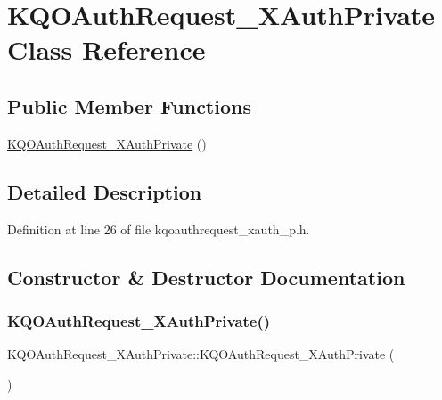 \hypertarget{class_k_q_o_auth_request___x_auth_private}{}\section{K\+Q\+O\+Auth\+Request\+\_\+\+X\+Auth\+Private Class Reference}
\label{class_k_q_o_auth_request___x_auth_private}
\subsection*{Public Member Functions}
\begin{DoxyCompactItemize}
\item 
\hyperlink{class_k_q_o_auth_request___x_auth_private_a983c5a691c5dc024207acbe34d57477a}{K\+Q\+O\+Auth\+Request\+\_\+\+X\+Auth\+Private} ()
\end{DoxyCompactItemize}


\subsection{Detailed Description}


Definition at line 26 of file kqoauthrequest\+\_\+xauth\+\_\+p.\+h.



\subsection{Constructor \& Destructor Documentation}
\mbox{\label{class_k_q_o_auth_request___x_auth_private_a983c5a691c5dc024207acbe34d57477a}} 
\subsubsection{\texorpdfstring{K\+Q\+O\+Auth\+Request\+\_\+\+X\+Auth\+Private()}{KQOAuthRequest\_XAuthPrivate()}}
{\footnotesize\ttfamily K\+Q\+O\+Auth\+Request\+\_\+\+X\+Auth\+Private\+::\+K\+Q\+O\+Auth\+Request\+\_\+\+X\+Auth\+Private (\begin{DoxyParamCaption}{ }\end{DoxyParamCaption})}

